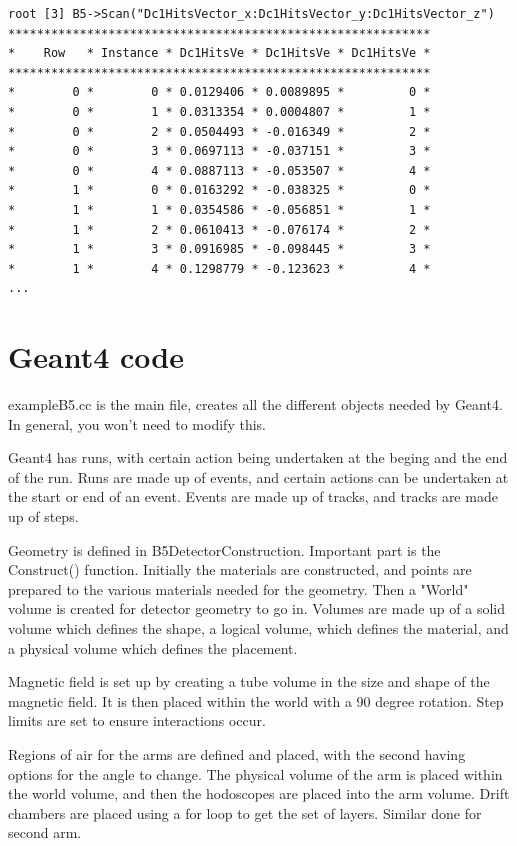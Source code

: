 \documentclass[a4paper,11pt,twoside]{article}
\begin{document}
\begin{lstlisting}
root [3] B5->Scan("Dc1HitsVector_x:Dc1HitsVector_y:Dc1HitsVector_z")
***********************************************************
*    Row   * Instance * Dc1HitsVe * Dc1HitsVe * Dc1HitsVe *
***********************************************************
*        0 *        0 * 0.0129406 * 0.0089895 *         0 *
*        0 *        1 * 0.0313354 * 0.0004807 *         1 *
*        0 *        2 * 0.0504493 * -0.016349 *         2 *
*        0 *        3 * 0.0697113 * -0.037151 *         3 *
*        0 *        4 * 0.0887113 * -0.053507 *         4 *
*        1 *        0 * 0.0163292 * -0.038325 *         0 *
*        1 *        1 * 0.0354586 * -0.056851 *         1 *
*        1 *        2 * 0.0610413 * -0.076174 *         2 *
*        1 *        3 * 0.0916985 * -0.098445 *         3 *
*        1 *        4 * 0.1298779 * -0.123623 *         4 *
...
\end{lstlisting}


\section{Geant4 code}
exampleB5.cc is the main file, creates all the different objects needed by Geant4. In general, you won't need to modify this. 

Geant4 has runs, with certain action being undertaken at the beging and the end of the run. Runs are made up of events, and certain actions can be undertaken at the start or end of an event. Events are made up of tracks, and tracks are made up of steps.

Geometry is defined in B5DetectorConstruction. Important part is the Construct() function.
Initially the materials are constructed, and points are prepared to the various materials needed for the geometry. Then a "World" volume is created for detector geometry to go in. Volumes are made up of a solid volume which defines the shape, a logical volume, which defines the material, and a physical volume which defines the placement. 

Magnetic field is set up by creating a tube volume in the size and shape of the magnetic field. It is then placed within the world with a 90 degree rotation. Step limits are set to ensure interactions occur.

Regions of air for the arms are defined and placed, with the second having options for the angle to change.
The physical volume of the arm is placed within the world volume, and then the hodoscopes are placed into the arm volume. Drift chambers are placed using a for loop to get the set of layers. Similar done for second arm.
\end{document}
